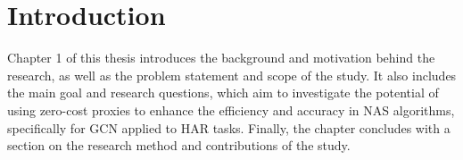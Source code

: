 \chapter{Introduction}
\begin{comment}
This chapter will introduce the thesis by stating its background and motivation. In addition, we will specify the main goal and the research questions. Lastly, we will present what contributions the thesis makes in addition to the overall structure of the thesis. 
\end{comment}
Chapter 1 of this thesis introduces the background and motivation behind the research, as well as the problem statement and scope of the study. It also includes the main goal and research questions, which aim to investigate the potential of using zero-cost proxies to enhance the efficiency and accuracy in \Gls{NAS} algorithms, specifically for \Gls{GCN} applied to \Gls{HAR} tasks. Finally, the chapter concludes with a section on the research method and contributions of the study.








